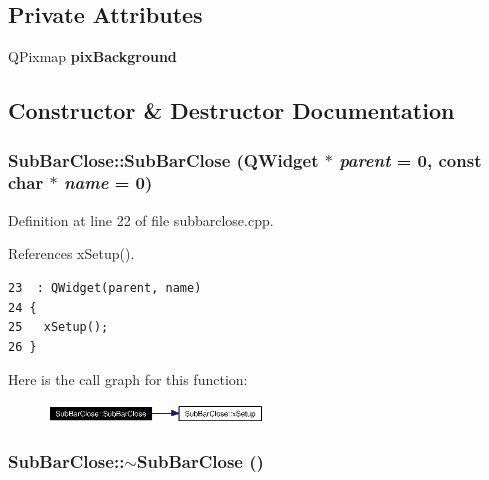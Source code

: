 \subsection*{Private Attributes}
\begin{CompactItemize}
\item 
QPixmap {\bf pix\-Background}
\end{CompactItemize}


\subsection{Constructor \& Destructor Documentation}
\subsubsection{\setlength{\rightskip}{0pt plus 5cm}Sub\-Bar\-Close::Sub\-Bar\-Close ({\bf QWidget} $\ast$ {\em parent} = 0, const char $\ast$ {\em name} = 0)}\label{classSubBarClose_SubBarClosea0}




Definition at line 22 of file subbarclose.cpp.

References x\-Setup().



\footnotesize\begin{verbatim}23  : QWidget(parent, name)
24 {
25   xSetup();
26 }
\end{verbatim}\normalsize 


Here is the call graph for this function:\begin{figure}[H]
\begin{center}
\leavevmode
\includegraphics[width=162pt]{classSubBarClose_SubBarClosea0_cgraph}
\end{center}
\end{figure}
\subsubsection{\setlength{\rightskip}{0pt plus 5cm}Sub\-Bar\-Close::$\sim${\bf Sub\-Bar\-Close} ()}\label{classSubBarClose_SubBarClosea1}




